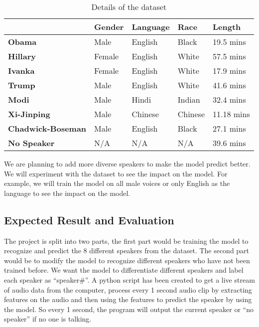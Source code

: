 \documentclass[10pt,twocolumn,letterpaper]{article}
\begin{document}
\begin{table}[h]
    \begin{tabular}{l|l|l|l|l|}
    \cline{2-5}
                                                    & \textbf{Gender} & \textbf{Language} & \textbf{Race} & \textbf{Length} \\ \hline
    \multicolumn{1}{|l|}{\textbf{Obama}}            & Male            & English           & Black         & 19.5 mins       \\ \hline
    \multicolumn{1}{|l|}{\textbf{Hillary}}          & Female          & English           & White         & 57.5 mins       \\ \hline
    \multicolumn{1}{|l|}{\textbf{Ivanka}}           & Female          & English           & White         & 17.9 mins       \\ \hline
    \multicolumn{1}{|l|}{\textbf{Trump}}            & Male            & English           & White         & 41.6 mins       \\ \hline
    \multicolumn{1}{|l|}{\textbf{Modi}}             & Male            & Hindi             & Indian        & 32.4 mins       \\ \hline
    \multicolumn{1}{|l|}{\textbf{Xi-Jinping}}       & Male            & Chinese           & Chinese       & 11.18 mins      \\ \hline
    \multicolumn{1}{|l|}{\textbf{Chadwick-Boseman}} & Male            & English           & Black         & 27.1 mins       \\ \hline
    \multicolumn{1}{|l|}{\textbf{No Speaker}}       & N/A             & N/A               & N/A           & 39.6 mins       \\ \hline
    \end{tabular}
    \caption{Details of the dataset}
    \label{Dataset}
\end{table}

We are planning to add more diverse speakers to make the model predict better. We will experiment with the dataset to see the impact on the model. For example, we will train the model on all male voices or only English as the language to see the impact on the model. 

\subsection{Expected Result and Evaluation}

The project is split into two parts, the first part would be training the model to recognize and predict the 8 different speakers from the dataset. The second part would be to modify the model to recognize different speakers who have not been trained before.  We want the model to differentiate different speakers and label each speaker as “speaker\#”. A python script has been created to get a live stream of audio data from the computer, process every 1 second audio clip by extracting features on the audio and then using the features to predict the speaker by using the model. So every 1 second, the program will output the current speaker or “no speaker” if no one is talking.   
\end{document}
